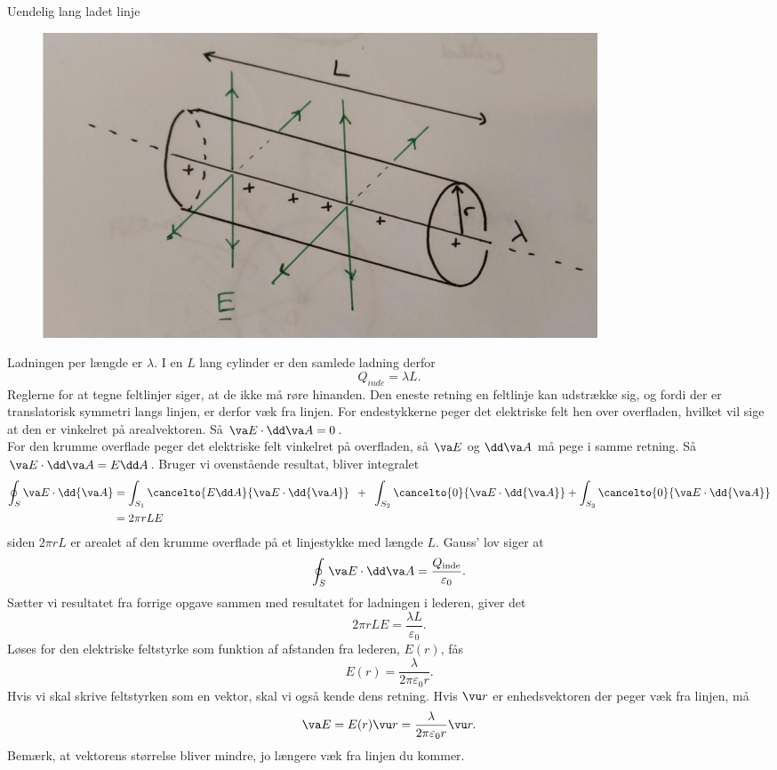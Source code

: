 \begin{opgave}{Uendelig lang ladet linje}
    \opg
    \begin{figure}[H]
        \centering
        \includegraphics[width=0.8\textwidth]{facit/figurer/elektro/elektro_opg5,1.jpg}
    \end{figure}
    \opg Ladningen per længde er $\lambda$. I en $L$ lang cylinder er den samlede ladning derfor
    \[ Q_{inde}=\lambda L. \]
    \opg Reglerne for at tegne feltlinjer siger, at de ikke må røre hinanden. Den eneste retning en feltlinje kan udstrække sig, og fordi der er translatorisk symmetri langs linjen, er derfor væk fra linjen.
    \opg For endestykkerne peger det elektriske felt hen over overfladen, hvilket vil sige at den er vinkelret på arealvektoren. Så $\va E\cdot \dd\va A=0$.\\
    For den krumme overflade peger det elektriske felt vinkelret på overfladen, så $\va E$ og $\dd\va A$ må pege i samme retning. Så $\va E\cdot \dd\va A=E\dd A$.
    \opg Bruger vi ovenstående resultat, bliver integralet
    \begin{align*}
        \oint_S \va E \cdot \dd{\va A} &= \int_{S_1} \cancelto{E\dd A}{\va E \cdot \dd{\va A}} \enspace + \enspace \int_{S_2} \cancelto{0}{\va E \cdot \dd{\va A}} + \int_{S_3} \cancelto{0}{\va E \cdot \dd{\va A}}\\
        &=2\pi r L E
    \end{align*}
    siden $2\pi rL$ er arealet af den krumme overflade på et linjestykke med længde $L$.
    \opg Gauss' lov siger at
    \[ \oint_S \va E\cdot \dd \va A=\frac{Q_\text{inde}}{\varepsilon_0}. \]
    Sætter vi resultatet fra forrige opgave sammen med resultatet for ladningen i lederen, giver det
    \[ 2\pi rLE=\frac{\lambda L}{\varepsilon_0}. \]
    Løses for den elektriske feltstyrke som funktion af afstanden fra lederen, $E(r)$, fås
    \[ E(r)=\frac{\lambda}{2\pi\varepsilon_0 r}. \]
    Hvis vi skal skrive feltstyrken som en vektor, skal vi også kende dens retning. Hvis $\vu r$ er enhedsvektoren der peger væk fra linjen, må
    \[ \va E=E(r)\vu r =\frac{\lambda}{2\pi\varepsilon_0 r}\vu r.\]
    Bemærk, at vektorens størrelse bliver mindre, jo længere væk fra linjen du kommer.
\end{opgave}

